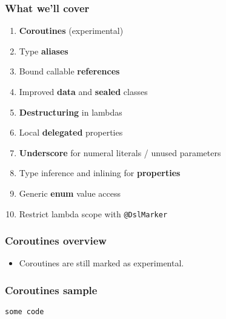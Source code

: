 


\begin{frame}\frametitle{What we'll cover}
  \begin{enumerate}[<+->]
  	\item \textbf{Coroutines} (experimental)
	\item Type \textbf{aliases}
	\item Bound callable \textbf{references}
	\item Improved \textbf{data} and \textbf{sealed} classes
	\item \textbf{Destructuring} in lambdas
	\item Local \textbf{delegated} properties
	\item \textbf{Underscore} for numeral literals / unused parameters %
	\item Type inference and inlining for \textbf{properties} %
	\item Generic \textbf{enum} value access
	\item Restrict lambda scope with \texttt{@DslMarker}
  \end{enumerate}
\end{frame}




\begin{frame}[fragile] \frametitle{Coroutines overview}
\begin{itemize}
	\item Coroutines are still marked as experimental.
\end{itemize}
\end{frame}

\begin{frame}[fragile] \frametitle{Coroutines sample}
\begin{lstlisting}
some code
\end{lstlisting}
\end{frame}

